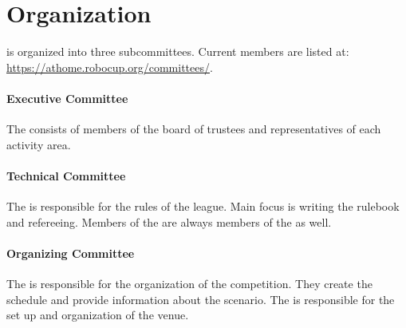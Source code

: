 \section{Organization}
\label{sec:introduction:organization}
\AtHome{} is organized into three subcommittees. Current members are listed at: 
\url{https://athome.robocup.org/committees/}.

\paragraph{Executive Committee}
\label{sec:introduction:ec}
The \EC{} consists of members of the board of trustees and representatives of each activity area.

\paragraph{Technical Committee}
\label{sec:introduction:tc}
The \TC{} is responsible for the rules of the league. Main focus is writing the rulebook and refereeing.
Members of the \EC{} are always members of the \TC{} as well.

\paragraph{Organizing Committee}
\label{sec:introduction:oc}
The \OC{} is responsible for the organization of the competition. They create the schedule and provide information about the scenario.
The \LOC{} is responsible for the set up and organization of the venue.
